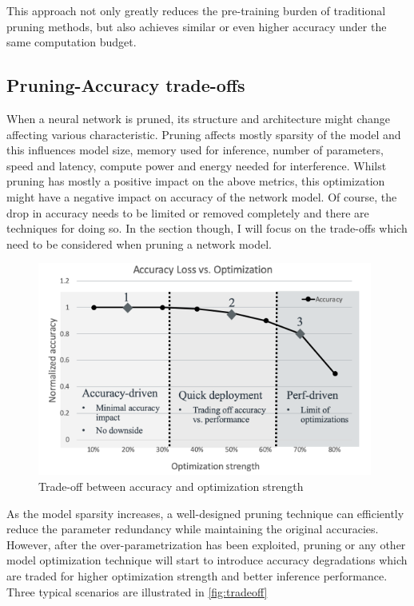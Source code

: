 This approach not only greatly reduces the pre-training burden of traditional
pruning methods, but also achieves similar or even higher accuracy under the
same computation budget.~\cite{Wang_2020}

\subsection{Pruning-Accuracy trade-offs}\label{subsec:tradeoff}
When a neural network is pruned, its structure and architecture might change
affecting various characteristic. Pruning affects mostly sparsity of the model
and this influences model size, memory used for inference, number of
parameters, speed and latency, compute power and energy needed for
interference.
Whilst pruning has mostly a positive impact on the above metrics, this
optimization might have a negative impact on accuracy of the network model. Of
course, the drop in accuracy needs to be limited or removed completely and
there are techniques for doing so.
In the section though, I will focus on the trade-offs which need to be
considered when pruning a network model.

\begin{figure}[ht]
    \includegraphics[width=11cm]{images/pruning/tradeoff.png}
    \centering
    \caption{Trade-off between accuracy and optimization strength}\label{fig:tradeoff}
\end{figure}

As the model sparsity increases, a well-designed pruning technique can
efficiently reduce the parameter redundancy while maintaining the original
accuracies. However, after the over-parametrization has been exploited, pruning
or any other model optimization technique will start to introduce accuracy
degradations which are traded for higher optimization strength and better
inference performance. Three typical scenarios are illustrated in \autoref{fig:tradeoff}

